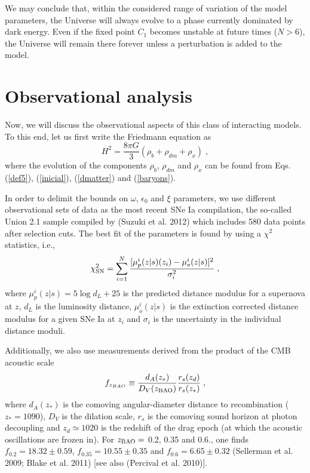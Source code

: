 \documentclass[twocolumn,preprintnumbers,amsmath,amssymb]{revtex4}
\begin{document}
We may conclude that, within the 
considered range of variation of the model parameters, the Universe 
will always evolve to a phase currently dominated by dark energy.
Even if the fixed point $C_{1}$ becomes unstable at future times
($N>6$), the Universe will remain there forever unless a perturbation
is added to the model. 


\section{Observational analysis}


Now, we will discuss the observational aspects of this class of interacting models. To this end, let us first write the Friedmann equation as
\begin{equation}\label{wang}
H^{2}= \frac{8\pi G}{3}(\rho_{b} + \rho_{dm} + \rho_{x})\;,
\end{equation}
where the evolution of the components $\rho_{b}$, $\rho_{dm}$ and $\rho_{x}$ can be found from Eqs. (\ref{def5}), (\ref{inicial}), (\ref{dmatter}) and (\ref{baryons}).

In order to delimit the bounds on $\omega$, $\epsilon_0$ and $\xi$ parameters, we use different observational sets of data as the most recent SNe Ia compilation, the so-called Union 2.1 sample compiled by (Suzuki et al. 2012) which includes 580 data points after selection cuts. The best fit of the parameters is found by using a $\chi^2$ statistics, i.e.,
\begin{equation}\label{chisquare}
\chi^2_{\rm{SN}} = \sum_{i=1}^N\frac{{[\mu_{p}^{i}(z|s)(z_i) - \mu_{o}^{i}(z|s)}]^{2}} {\sigma_i^2}\;,
\end{equation}
where $\mu_{p}^{i}(z|s) = 5\log d_L + 25$ is the predicted distance modulus for a supernova at $z$, $d_L$ is the luminosity distance, $\mu_{o}^{i}(z|s)$ is the extinction corrected distance modulus for a given SNe Ia at $z_i$ and $\sigma_i$ is the uncertainty in the individual distance moduli.

Additionally, we also use measurements derived from the product of the CMB acoustic scale 
\begin{equation}
f_{z_{BAO}} \equiv \frac{d_A (z_*)}{D_V(z_{\rm{BAO}})} \frac{r_s(z_d)}{r_s(z_*)}\;,
\end{equation}
where $d_A (z_*)$ is the comoving angular-diameter distance to recombination ($z_* = 1090$), $D_V$ is the dilation scale, $r_s$ is the comoving sound horizon at photon decoupling and $z_d \simeq 1020$ is the redshift of the drag epoch (at which the acoustic oscillations are frozen in). For $z_{\rm{BAO}} =$ 0.2, 0.35 and 0.6., one 
finds $f_{0.2} = 18.32 \pm 0.59$, $f_{0.35} = 10.55 \pm 0.35$ and $ f_{0.6} = 6.65 \pm 0.32$ (Sellerman et al. 2009; Blake et al. 2011) [see also (Percival et al. 2010)].
\end{document}

